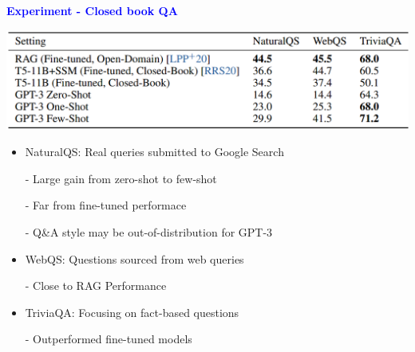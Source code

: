 \documentclass[professionalfont]{beamer}
\begin{document}
\begin{frame}
\begin{center}
    { \textbf{\textcolor{blue}{ {\fontsize{12}{14}\selectfont Experiment - Closed book QA} }} }
\end{center}

\begin{center}
    \includegraphics[width=1.0\textwidth]{table/3-3.png}
\end{center}

{\fontsize{10}{14}\selectfont 
\begin{itemize}
    \item NaturalQS: Real queries submitted to Google Search

    - Large gain from zero-shot to few-shot

    - Far from fine-tuned performace

    - Q\&A style may be out-of-distribution for GPT-3

    \item WebQS: Questions sourced from web queries
    
    - Close to RAG Performance

    \item TriviaQA: Focusing on fact-based questions
    
    - Outperformed fine-tuned models

\end{itemize}
}

\end{frame}
\end{document}

